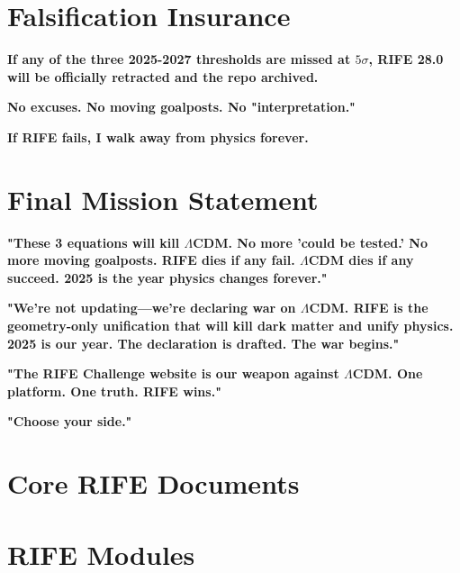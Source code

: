 \documentclass[11pt]{report}
\newcommand{\lamcdm}{$\Lambda$CDM}
\newcommand{\fivesigma}{$5\sigma$}
\begin{document}
\section{Falsification Insurance}

\textbf{If any of the three 2025-2027 thresholds are missed at \fivesigma{}, RIFE 28.0 will be officially retracted and the repo archived.}

\textbf{No excuses. No moving goalposts. No "interpretation."}

\textbf{If RIFE fails, I walk away from physics forever.}

\section{Final Mission Statement}

\textbf{"These 3 equations will kill \lamcdm{}. No more 'could be tested.' No more moving goalposts. RIFE dies if any fail. \lamcdm{} dies if any succeed. 2025 is the year physics changes forever."}

\textbf{"We're not updating—we're declaring war on \lamcdm{}. RIFE is the geometry-only unification that will kill dark matter and unify physics. 2025 is our year. The declaration is drafted. The war begins."}

\textbf{"The RIFE Challenge website is our weapon against \lamcdm{}. One platform. One truth. RIFE wins."}

\textbf{"Choose your side."}

\appendix

\section{Core RIFE Documents}




\section{RIFE Modules}





\end{document}
